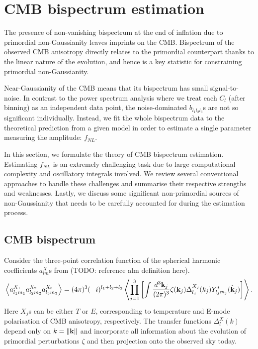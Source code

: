 \section{CMB bispectrum estimation} \label{section:CMB_bispectrum_estimation}

The presence of non-vanishing bispectrum at the end of inflation due to primordial non-Gaussianity leaves imprints on the CMB. Bispectrum of the observed CMB anisotropy directly relates to the primordial counterpart thanks to the linear nature of the evolution, and hence is a key statistic for constraining primordial non-Gaussianity.

Near-Gaussianity of the CMB means that its bispectrum has small signal-to-noise. In contrast to the power spectrum analysis where we treat each $C_l$ (after binning) as an independent data point, the noise-dominated $b_{l_1 l_2 l_3}$s are not so significant individually. Instead, we fit the whole bispectrum data to the theoretical prediction from a given model in order to estimate a single parameter measuring the amplitude: $f_{NL}$.

In this section, we formulate the theory of CMB bispectrum estimation. Estimating $f_{NL}$ is an extremely challenging task due to large computational complexity and oscillatory integrals involved. We review several conventional approaches to handle these challenges and summarise their respective strengths and weaknesses. Lastly, we discuss some significant non-primordial sources of non-Gaussianity that needs to be carefully accounted for during the estimation process.


\subsection{CMB bispectrum}

Consider the three-point correlation function of the spherical harmonic coefficients $a_{lm}^X$s from (TODO: reference alm definition here).
\begin{align}
	\left< a_{l_1 m_1}^{X_1} a_{l_2 m_2}^{X_2} a_{l_3 m_3}^{X_3}  \right> = (4\pi)^3 (-i)^{l_1 + l_2 + l_3} \left< \prod_{j=1}^{3} \left[ \int \frac{d^3\mathbf{k}_j}{(2\pi)^3} \zeta(\mathbf{k}_j)   \Delta_{l_j}^{X_j} (k_j) Y^*_{l_j m_j} (\hat{\mathbf{k}}_j) \right] \right>. \label{eqn:bispectrum_derivation_base_form}
\end{align}
Here $X_j$s can be either $T$ or $E$, corresponding to temperature and E-mode polarisation of CMB anisotropy, respectively. The transfer functions $\Delta_l^X (k)$ depend only on $k=\left\| \mathbf{k} \right\|$ and incorporate all information about the evolution of primordial perturbations $\zeta$ and then projection onto the observed sky today.

